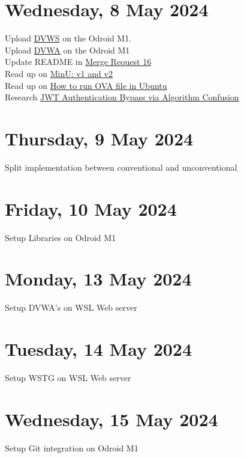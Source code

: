 \section[2024/05/08]{Wednesday, 8 May 2024}
Upload \href{https://github.com/interference-security/DVWS}{DVWS} on the Odroid M1.\\
Upload \href{https://github.com/digininja/DVWA}{DVWA} on the Odroid M1\\
Update README in \href{https://repo.ee.up.ac.za/eece_ugfyp_tg/2024_isg/tg4-koot-u20426471/-/merge_requests/16}{Merge Request 16}\\
Read up on \href{https://www.sevenlayers.com/index.php/206-vulnhub-minu-1-walkthrough}{MinU: v1 and v2}\\
Read up on \href{https://www.google.com/search?q=how+to+run+ova+file+in+ubuntu&rlz=1C1UKOV_enZA1073ZA1073&oq=run+ova+file+in+ubunru&gs_lcrp=EgZjaHJvbWUqCggBEAAYBRgNGB4yBggAEEUYOTIKCAEQABgFGA0YHjINCAIQABiGAxiABBiKBTINCAMQABiGAxiABBiKBTINCAQQABiGAxiABBiKBTIKCAUQABiiBBiJBTIKCAYQABiABBiiBDIKCAcQABiABBiiBNIBCTEwMzc1ajBqN6gCALACAA&sourceid=chrome&ie=UTF-8}{How to run OVA file in Ubuntu}\\
Research \href{https://www.youtube.com/watch?v=d-X9CmpnJdE}{JWT Authentication Bypass via Algorithm Confusion}\\
\pendsign

\section[2024/05/09]{Thursday, 9 May 2024}
Split implementation between conventional and unconventional
\pendsign

\section[2024/05/10]{Friday, 10 May 2024}
Setup Libraries on Odroid M1
\pendsign

\section[2024/05/13]{Monday, 13 May 2024}
Setup DVWA's on WSL Web server
\pendsign

\section[2024/05/14]{Tuesday, 14 May 2024}
Setup WSTG on WSL Web server
\pendsign

\section[2024/05/15]{Wednesday, 15 May 2024}
Setup Git integration on Odroid M1
\pendsign

